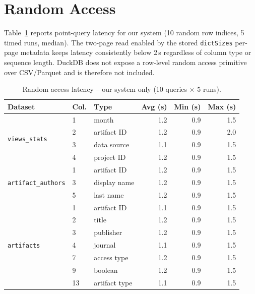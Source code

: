 \documentclass[a4paper,11pt]{article}
\begin{document}
\newpage
\section{Random Access}

Table~\ref{tab:ra} reports point-query latency for our system (10 random
row indices, 5 timed runs, median). The two-page read enabled by the
stored \texttt{dictSizes} per-page metadata keeps latency consistently
below 2\,\textmu{}s regardless of column type or sequence length.
DuckDB does not expose a row-level random access primitive over
CSV/Parquet and is therefore not included.

\begin{table}[h]
\centering
\caption{Random access latency -- our system only (10 queries $\times$ 5 runs).}
\label{tab:ra}
\begin{tabular}{lllrrr}
\toprule
\textbf{Dataset} & \textbf{Col.} & \textbf{Type} &
  \textbf{Avg (\textmu{}s)} & \textbf{Min (\textmu{}s)} & \textbf{Max (\textmu{}s)} \\
\midrule
\multirow{4}{*}{\texttt{views\_stats}}
  & 1 & month          & 1.2 & 0.9 & 1.5 \\
  & 2 & artifact ID    & 1.2 & 0.9 & 2.0 \\
  & 3 & data source    & 1.1 & 0.9 & 1.5 \\
  & 4 & project ID     & 1.2 & 0.9 & 1.5 \\
\midrule
\multirow{3}{*}{\texttt{artifact\_authors}}
  & 1 & artifact ID    & 1.2 & 0.9 & 1.5 \\
  & 3 & display name   & 1.2 & 0.9 & 1.5 \\
  & 5 & last name      & 1.2 & 0.9 & 1.5 \\
\midrule
\multirow{7}{*}{\texttt{artifacts}}
  & 1  & artifact ID   & 1.1 & 0.9 & 1.5 \\
  & 2  & title         & 1.2 & 0.9 & 1.5 \\
  & 3  & publisher     & 1.2 & 0.9 & 1.5 \\
  & 4  & journal       & 1.1 & 0.9 & 1.5 \\
  & 7  & access type   & 1.2 & 0.9 & 1.5 \\
  & 9  & boolean       & 1.2 & 0.9 & 1.5 \\
  & 13 & artifact type & 1.1 & 0.9 & 1.5 \\
\bottomrule
\end{tabular}
\end{table}
\end{document}
